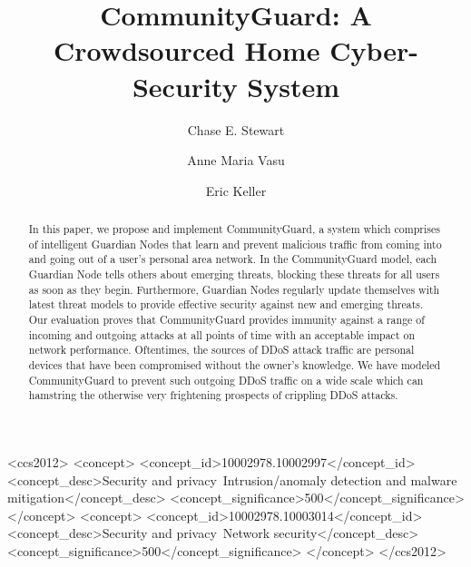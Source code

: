 \documentclass[sigconf]{acmart}
\begin{document}
\title{CommunityGuard: A Crowdsourced Home Cyber-Security System}

\author{Chase E. Stewart}

\author{Anne Maria Vasu}

\author{Eric Keller}

\setlength{\pdfpagewidth}{8.5in}
\setlength{\pdfpageheight}{11in}

\thispagestyle{empty}

\begin{abstract}
In this paper, we propose and implement CommunityGuard, a system which comprises of intelligent Guardian Nodes that learn and prevent malicious traffic from coming into and going out of a user's personal area network. In the CommunityGuard model, each Guardian Node tells others about emerging threats, blocking these threats for all users as soon as they begin. Furthermore, Guardian Nodes regularly update themselves with latest threat models to provide effective security against new and emerging threats. Our evaluation proves that CommunityGuard provides immunity against a range of incoming and outgoing attacks at all points of time with an acceptable impact on network performance. Oftentimes, the sources of DDoS attack traffic are personal devices that have been compromised without the owner's knowledge. We have modeled CommunityGuard to prevent such outgoing DDoS traffic on a wide scale which can hamstring the otherwise very frightening prospects of crippling DDoS attacks.
\end{abstract}

\begin{CCSXML}
<ccs2012>
	<concept>
		<concept_id>10002978.10002997</concept_id>
		<concept_desc>Security and privacy~Intrusion/anomaly detection and malware mitigation</concept_desc>
		<concept_significance>500</concept_significance>
	</concept>
	<concept>
		<concept_id>10002978.10003014</concept_id>
		<concept_desc>Security and privacy~Network security</concept_desc>
		<concept_significance>500</concept_significance>
	</concept>
</ccs2012>
\end{CCSXML}


\maketitle










\end{document}
